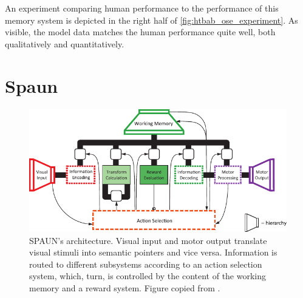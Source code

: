 \documentclass[10pt,letterpaper,oneside]{article}
\begin{document}
An experiment comparing human performance to the performance of this memory system is depicted in the right half of \cref{fig:htbab_ose_experiment}. As visible, the model data matches the human performance quite well, both qualitatively and quantitatively.



\section{Spaun}

\begin{figure}
	\includegraphics[width=\textwidth]{media/eliasmith_2012_spaun_architecture.pdf}
	\caption{SPAUN's architecture. Visual input and motor output translate visual stimuli into semantic pointers and vice versa. Information is routed to different subsystems according to an action selection system, which, turn, is controlled by the content of the working memory and a reward system. Figure copied from \cite{eliasmith2012largescale}.}
	\label{fig:eliasmith_2012_spaun_architecture}
\end{figure}
\end{document}
